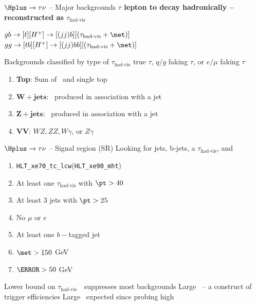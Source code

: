 \documentclass[10pt]{beamer}
\newcommand*{\tauvis}{\ensuremath{\tau_{\text{had-vis}}}}
\newcommand*{\Wjets}{\ensuremath{W+\text{jets}}}
\newcommand*{\Zjets}{\ensuremath{Z+\text{jets}}}
\begin{document}
\begin{frame}{$\Hplus\to\tau\nu$ -- Major backgrounds}
\centering
{\large\bf $\tau$ lepton to decay hadronically -- reconstructed as \tauvis}
\vspace*{\baselineskip}

{\large\color{blue} $gb\to[t][H^+]\to[(jj)b][(\tauvis+\met)]$} \\
\vspace*{\baselineskip}
{\large\color{red} $gg\to[tb][H^+]\to[(jj)bb][(\tauvis+\met)]$} 
\begin{outline}
\1 Backgrounds classified by type of $\tauvis$
	\2 true $\tau$,  $q/g$ faking $\tau$, or $e/\mu$ faking $\tau$
\end{outline}

\begin{tcolorbox}[title=Background processes, width=\linewidth, colback=white,colframe=red!50!white,nobeforeafter,tcbox raise base,top=0pt,left=0pt,right=0pt,bottom=0pt]
\begin{enumerate}
	\item {\bf Top}: Sum of \ttbar\ and single top
	\item {\bf $\boldsymbol{\Wjets}$}: \Wpm\ produced in association with a jet
	\item {\bf $\boldsymbol{\Zjets}$}: \Zboson\ produced in association with a jet
	\item {\bf VV}: $WZ,ZZ,W\gamma$, or $Z\gamma$ 
\end{enumerate}
\end{tcolorbox}
\end{frame}

\begin{frame}{$\Hplus\to\tau\nu$ -- Signal region (SR)}
\centering
{\large\color{blue} Looking for jets, b-jets, a \tauvis, and \met} 

\centering
\begin{tcolorbox}[title=Signal Selection, width=0.7\linewidth, colback=white,colframe=red!50!white,nobeforeafter,tcbox raise base,top=0pt,left=0pt,right=0pt,bottom=0pt]
\begin{enumerate}
\item \texttt{HLT\_xe70\_tc\_lcw}(\texttt{HLT\_xe90\_mht})
\item At least one $\tauvis$ with $\pt>40$~\GeV  
\item At least 3 jets with $\pt>25$~\GeV 
\item No $\mu$ or $e$  
\item At least one $b-$tagged jet 				
\item $\met>150$ GeV 
\item $\mT>50$ GeV 
\end{enumerate}
\end{tcolorbox}

\begin{outline}
\1 Lower bound on \tauvis\ \pt\ suppresses most backgrounds 
\1 Large \met\ -- a construct of trigger efficiencies 
\1 Large \mT\ expected since probing high \mcH 
\end{outline}
\end{frame}
\end{document}
